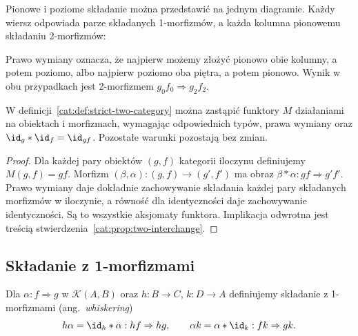 Pionowe i poziome składanie można przedstawić na jednym diagramie. Każdy wiersz odpowiada parze składanych 1-morfizmów, a każda kolumna pionowemu składaniu 2-morfizmów:
\begin{center}
\end{center}
Prawo wymiany oznacza, że najpierw możemy złożyć pionowo obie kolumny, a potem poziomo, albo najpierw poziomo oba piętra, a potem pionowo. Wynik w obu przypadkach jest 2-morfizmem $g_0f_0\Rightarrow g_2f_2$.

\begin{stwierdzenie}\label{cat:prop:two-axioms-equivalence}
W definicji~\ref{cat:def:strict-two-category} można zastąpić funktory $M$ działaniami na obiektach i morfizmach, wymagając odpowiednich typów, prawa wymiany oraz $\id_g\ast\id_f=\id_{gf}$. Pozostałe warunki pozostają bez zmian.
\end{stwierdzenie}
\begin{proof}
Dla każdej pary obiektów $(g,f)$ kategorii iloczynu definiujemy $M(g,f)=gf$. Morfizm $(\beta,\alpha):(g,f)\to(g',f')$ ma obraz $\beta\ast\alpha:gf\Rightarrow g'f'$. Prawo wymiany daje dokładnie zachowywanie składania każdej pary składanych morfizmów w iloczynie, a równość dla identyczności daje zachowywanie identyczności. Są to wszystkie aksjomaty funktora. Implikacja odwrotna jest treścią stwierdzenia~\ref{cat:prop:two-interchange}.
\end{proof}

\subsection{Składanie z 1-morfizmami}

Dla $\alpha:f\Rightarrow g$ w $\mathcal K(A,B)$ oraz $h:B\to C$, $k:D\to A$ definiujemy składanie z 1-morfizmami (ang.\ \emph{whiskering})
\[
 h\alpha=\id_h\ast\alpha:hf\Rightarrow hg,\qquad
 \alpha k=\alpha\ast\id_k:fk\Rightarrow gk.
\]

